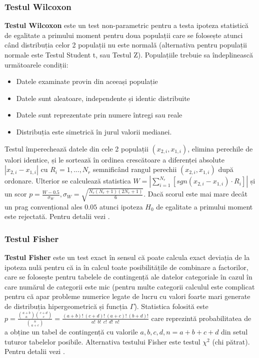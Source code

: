 \documentclass[12pt]{article}
\begin{document}
\subsubsection{Testul Wilcoxon}
 \textbf{Testul Wilcoxon} este un test non-parametric pentru a testa ipoteza statistică de egalitate a primului moment pentru doua populații care se folosește atunci când distribuția celor 2 populații nu este normală (alternativa pentru populații normale este Testul Student t, sau Testul Z). 
 Populațiile trebuie sa îndeplinească următoarele condiții:
 \begin{itemize}
  \item Datele examinate provin din aceeași populație
  \item Datele sunt aleatoare, independente și identic distribuite
  \item Datele sunt reprezentate prin numere întregi sau reale
  \item Distribuția este simetrică în jurul valorii medianei.
 \end{itemize}
  Testul împerechează datele din cele 2 populații $(x_{2,i},x_{1,i})$, elimina perechile de valori identice, și le sortează în ordinea crescătoare a diferenței absolute $|x_{2,i}-x_{1,i}|$ cu $R_i=1, ..., N_r$ semnificând rangul perechii $(x_{2,i},x_{1,i})$ după ordonare. 
  Ulterior se calculează statistica $W = |\sum_{i=1}^{N_r} [sgn(x_{2,i} - x_{1,i}) \cdot R_i]| $ și un scor $p = \frac{W - 0.5}{\sigma_W}, \sigma_W = \sqrt{\frac{N_r(N_r + 1)(2N_r + 1)}{6}}$. 
  Dacă scorul este mai mare decât un prag convențional ales $0.05$ atunci ipoteza $H_0$ de egalitate a primului moment este rejectată. 
  Pentru detalii vezi \citep{wilcoxon45,siegel56}.

\subsubsection{Testul Fisher}
 \label{testFisher}
 \textbf{Testul Fisher} este un test exact în sensul că poate calcula exact deviația de la ipoteza nulă pentru că ia în calcul toate posibilitățile de combinare a factorilor, care se folosește pentru tabelele de contingență ale datelor categoriale în cazul în care numărul de categorii este mic (pentru multe categorii calculul este complicat pentru că apar probleme numerice legate de lucru cu valori foarte mari generate de distribuția hipergeometrică și funcția $\Gamma$). Statistica folosită este $p = \frac{ \displaystyle{{a+b}\choose{a}} \displaystyle{{c+d}\choose{c}} }{ \displaystyle{{n}\choose{a+c}} } = \frac{(a+b)!~(c+d)!~(a+c)!~(b+d)!}{a!~~b!~~c!~~d!~~n!}$ care reprezintă probabilitatea de a obține un tabel de contingență cu valorile $a, b, c, d, n=a+b+c+d$ din setul tuturor tabelelor posibile. Alternativa testului Fisher este testul $\chi^2$ (chi pătrat). Pentru detalii vezi \citep{fisher1922interpretation}.
\end{document}
